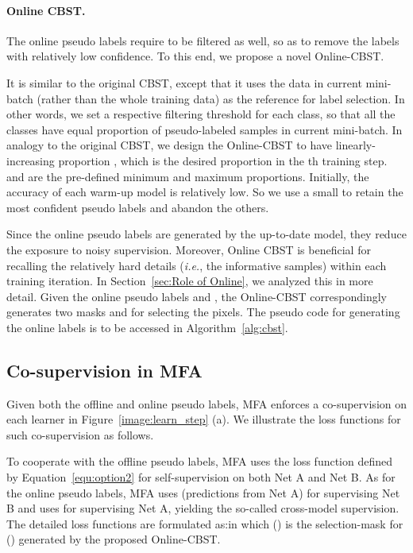 \documentclass{bmvc2k}
\begin{document}
\paragraph{Online CBST.} The online pseudo labels require to be filtered as well, so as to remove the labels with relatively low confidence. To this end, we propose a novel Online-CBST. 

It is similar to the original CBST, except that it uses the data in current mini-batch (rather than the whole training data) as the reference for label selection. In other words, we set a respective filtering threshold for each class, so that all the classes have equal proportion of pseudo-labeled samples in current mini-batch. In analogy to the original CBST, we design the Online-CBST to have linearly-increasing proportion , which is the desired proportion in the th training step.  and  are the pre-defined minimum and maximum proportions. Initially, the accuracy of each warm-up model is relatively low. So we use a small  to retain the most confident pseudo labels and abandon the others.

Since the online pseudo labels are generated by the up-to-date model, they reduce the exposure to noisy supervision. Moreover, Online CBST is beneficial for recalling the relatively hard details (\emph{i.e.}, the informative samples) within each training iteration. In Section~\ref{sec:Role of Online}, we analyzed this in more detail. Given the online pseudo labels  and , the Online-CBST correspondingly generates two masks  and  for selecting the pixels. The pseudo code for generating the online labels is to be accessed in Algorithm~\ref{alg:cbst}. 

\subsection{Co-supervision in MFA} \label{sec: co-supervision}

Given both the offline and online pseudo labels, MFA enforces a co-supervision on each learner in Figure~\ref{image:learn_step} (a). We illustrate the loss functions for such co-supervision as follows.

To cooperate with the offline pseudo labels, MFA uses the loss function  defined by Equation~\ref{equ:option2} for self-supervision on both Net A and Net B. As for the online pseudo labels, MFA uses  (predictions from Net A) for supervising Net B and uses  for supervising Net A, yielding the so-called cross-model supervision. The detailed loss functions are formulated as:in which  () is the selection-mask for  () generated by the proposed Online-CBST.
\end{document}
